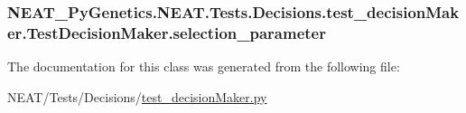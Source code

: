 \subsubsection[{\texorpdfstring{selection\+\_\+parameter}{selection_parameter}}]{\setlength{\rightskip}{0pt plus 5cm}N\+E\+A\+T\+\_\+\+Py\+Genetics.\+N\+E\+A\+T.\+Tests.\+Decisions.\+test\+\_\+decision\+Maker.\+Test\+Decision\+Maker.\+selection\+\_\+parameter}\hypertarget{classNEAT__PyGenetics_1_1NEAT_1_1Tests_1_1Decisions_1_1test__decisionMaker_1_1TestDecisionMaker_a48bf19a9ef756a110e01193d8a9e893e}{}\label{classNEAT__PyGenetics_1_1NEAT_1_1Tests_1_1Decisions_1_1test__decisionMaker_1_1TestDecisionMaker_a48bf19a9ef756a110e01193d8a9e893e}


The documentation for this class was generated from the following file\+:\begin{DoxyCompactItemize}
\item 
N\+E\+A\+T/\+Tests/\+Decisions/\hyperlink{test__decisionMaker_8py}{test\+\_\+decision\+Maker.\+py}\end{DoxyCompactItemize}
